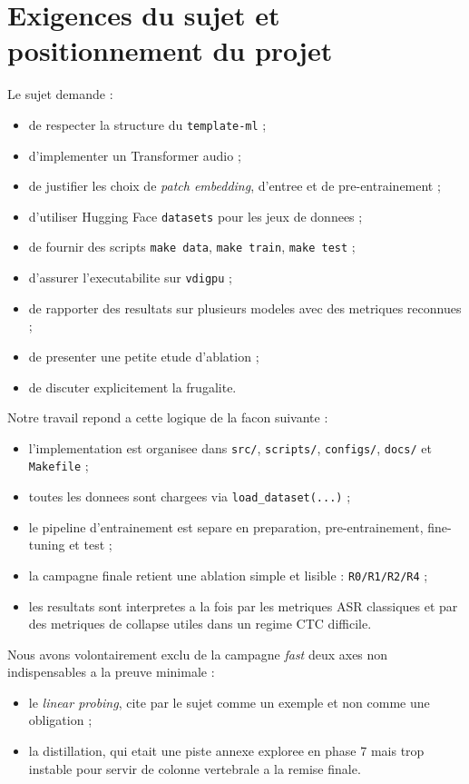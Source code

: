 \documentclass[11pt,a4paper]{article}
\begin{document}
\section{Exigences du sujet et positionnement du projet}
Le sujet demande :
\begin{itemize}[leftmargin=1.2cm]
\item de respecter la structure du \texttt{template-ml} ;
\item d'implementer un Transformer audio ;
\item de justifier les choix de \textit{patch embedding}, d'entree et de pre-entrainement ;
\item d'utiliser Hugging Face \texttt{datasets} pour les jeux de donnees ;
\item de fournir des scripts \texttt{make data}, \texttt{make train}, \texttt{make test} ;
\item d'assurer l'executabilite sur \texttt{vdigpu} ;
\item de rapporter des resultats sur plusieurs modeles avec des metriques reconnues ;
\item de presenter une petite etude d'ablation ;
\item de discuter explicitement la frugalite.
\end{itemize}

Notre travail repond a cette logique de la facon suivante :
\begin{itemize}[leftmargin=1.2cm]
\item l'implementation est organisee dans \texttt{src/}, \texttt{scripts/}, \texttt{configs/}, \texttt{docs/} et \texttt{Makefile} ;
\item toutes les donnees sont chargees via \texttt{load\_dataset(...)} ;
\item le pipeline d'entrainement est separe en preparation, pre-entrainement, fine-tuning et test ;
\item la campagne finale retient une ablation simple et lisible : \texttt{R0/R1/R2/R4} ;
\item les resultats sont interpretes a la fois par les metriques ASR classiques et par des metriques de collapse utiles dans un regime CTC difficile.
\end{itemize}

Nous avons volontairement exclu de la campagne \textit{fast} deux axes non indispensables a la preuve minimale :
\begin{itemize}[leftmargin=1.2cm]
\item le \textit{linear probing}, cite par le sujet comme un exemple et non comme une obligation ;
\item la distillation, qui etait une piste annexe exploree en phase 7 mais trop instable pour servir de colonne vertebrale a la remise finale.
\end{itemize}
\end{document}
